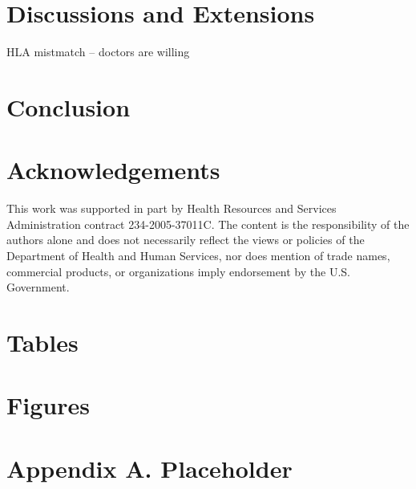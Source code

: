 \documentclass[12pt]{article}
\begin{document}
\section{Discussions and Extensions} \label{sec:discussion}

HLA mistmatch -- doctors are willing 

\section{Conclusion} \label{sec:conclusion}


\section{Acknowledgements}

This work was supported in part by Health Resources and Services Administration contract 234-2005-37011C. The content is the responsibility of the authors alone and does not necessarily reflect the views or policies of the Department of Health and Human Services, nor does mention of trade names, commercial products, or organizations imply endorsement by the U.S. Government.

\clearpage





\clearpage

\onehalfspacing

\section*{Tables} \label{sec:tab}



\clearpage

\section*{Figures} \label{sec:fig}




\clearpage

\section*{Appendix A. Placeholder} \label{sec:appendixa}
\end{document}
